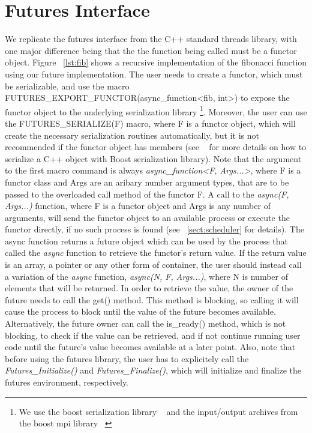 \section{Futures Interface}
\label{sect:futures-interface}
We replicate the futures interface from the C++ standard threads library, with one major difference being that 
the the function being called must be a functor object.  Figure ~\ref{lst:fib} shows a recursive implementation
of the fibonacci function using our future implementation.  The user needs to create a functor, which must be
serializable, and use the macro 
FUTURES\_EXPORT\_FUNCTOR(async\_function<fib, int>) to expose the functor object to the underlying 
serialization library \footnote{We use the boost serialization library ~\cite{Ramey:2004:Boost:Serialization} 
and the input/output archives from the boost mpi library ~\cite{Gregor:2005:Boost:MPI}}.
Moreover, the user can use the FUTURES\_SERIALIZE(F) macro, where F is a functor object, 
which will create the necessary serialization routines automatically, but it is not recommended if the 
functor object has members (see ~\cite{Ramey:2004:Boost:Serialization} for more details on how to serialize
a C++ object with Boost serialization library).
Note that the argument to the first macro command is always \emph{async\_function<F, Args...>},
where F is a functor class
and Args are an aribary number argument types, that are to be passed to the overloaded call method 
of the functor F.  A call to the \emph{async(F, Args...)} function, where F is a functor object and Args 
is any number of arguments,
will send the functor object to an available process or execute 
the functor directly, if no such process is found (see ~\ref{sect:scheduler} for details). 
The async function returns a 
future object which can be used by the process that called the \emph{async} function to retrieve the 
functor's return value.  If the return value is an array, a pointer or any other form of container, the user
should instead call a variation of the \emph{async} function, \emph{async(N, F, Args...)}, 
where N is number of elements that will be returned. In order to retrieve the value,
the owner of the future needs to call the get() method.  This method is blocking, so calling it will cause the 
process to block until the value of the future becomes available.  Alternatively, the future owner can call the
is\_ready() method, which is not blocking, to check if the value can be retrieved, and if not continue running
user code until the future's value becomes available at a later point.  Also, note that before using
the futures library, the user has to explicitely call the \emph{Futures\_Initialize()} and \emph{Futures\_Finalize()},
which will initialize and finalize the futures environment, respectively. 

